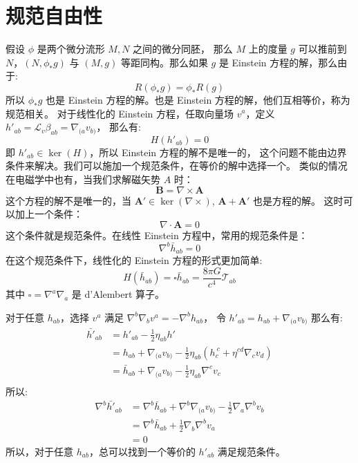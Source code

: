 \documentclass[lang=cn,a4paper,newtx]{elegantpaper}
\begin{document}
\section{规范自由性}
假设 $\phi$ 是两个微分流形 $M, N$ 之间的微分同胚，
那么 $M$ 上的度量 $g$ 可以推前到 $N$，$(N, \phi_*g)$ 与 $(M, g)$ 
等距同构。那么如果 $g$ 是 Einstein
方程的解，那么由于:
$$
R(\phi_*g) = \phi_*R(g)
$$
所以 $\phi_*g$ 也是 Einstein 方程的解。也是 Einstein 方程的解，他们互相等价，称为规范相关。
对于线性化的 Einstein 方程，任取向量场 $v^a$，定义 $h'_{ab} = \mathcal{L}_v\beta_{ab} = \nabla_{(a}v_{b)}$，
那么有:
$$
H(h'_{ab}) = 0 
$$
即 $h'_{ab}\in \ker(H)$，所以 Einstein 方程的解不是唯一的，
这个问题不能由边界条件来解决。我们可以施加一个规范条件，在等价的解中选择一个。
类似的情况在电磁学中也有，当我们求解磁矢势 $A$ 时：
$$
\boldsymbol{B} = \nabla \times \boldsymbol{A}
$$
这个方程的解不是唯一的，当 $\boldsymbol{A}'\in\ker(\nabla\times)$, 
$\boldsymbol{A+A}'$ 也是方程的解。
这时可以加上一个条件：
$$
\nabla\cdot\boldsymbol{A} = 0
$$
这个条件就是规范条件。在线性 Einstein 方程中，常用的规范条件是：
$$
\nabla^b\bar{h}_{ab} = 0
$$
在这个规范条件下，线性化的 Einstein 方程的形式更加简单:
$$
H(\bar{h}_{ab}) = \square\bar{h}_{ab} = \frac{8\pi G}{c^4}\mathcal{T}_{ab} 
$$
其中 $\square = \nabla^a\nabla_a$ 是 d'Alembert 算子。
\begin{note}
对于任意 $h_{ab}$，选择 $v^a$ 满足 $\nabla^b\nabla_b v^a = -\nabla^b h_{ab}$，
令 $h'_{ab} = h_{ab}+\nabla_{(a}v_{b)}$ 那么有:
$$
\begin{aligned}
\bar{h'}_{ab} 
& = h'_{ab} - \frac{1}{2}\eta_{ab}h'\\
& = h_{ab} + \nabla_{(a}v_{b)} - \frac{1}{2}\eta_{ab}(h_{c}^{\ c} + 
\eta^{cd}\nabla_{c}v_{d})\\
& = \bar{h}_{ab} + \nabla_{(a}v_{b)} - \frac{1}{2}\eta_{ab}\nabla^{c}v_{c}\\
\end{aligned}
$$
所以:
$$
\begin{aligned}
\nabla^b \bar{h'}_{ab} & = \nabla^b\bar{h}_{ab} + \nabla^b\nabla_{(a}v_{b)} - \frac{1}{2}\nabla_a\nabla^bv_b\\
& = \nabla^b\bar{h}_{ab} + \frac{1}{2}\nabla_b\nabla^bv_a\\
& = 0
\end{aligned}
$$
所以，对于任意 $h_{ab}$，总可以找到一个等价的 $h'_{ab}$ 满足规范条件。
\end{note}
\end{document}
